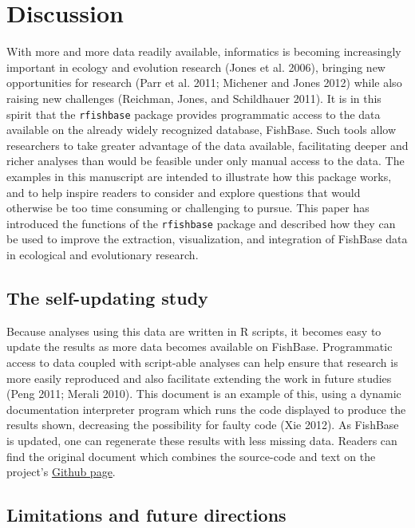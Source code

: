 \section{Discussion}

With more and more data readily available, informatics is becoming
increasingly important in ecology and evolution research (Jones et al.
2006), bringing new opportunities for research (Parr et al. 2011;
Michener and Jones 2012) while also raising new challenges (Reichman,
Jones, and Schildhauer 2011). It is in this spirit that the
\texttt{rfishbase} package provides programmatic access to the data
available on the already widely recognized database, FishBase. Such
tools allow researchers to take greater advantage of the data available,
facilitating deeper and richer analyses than would be feasible under
only manual access to the data. The examples in this manuscript are
intended to illustrate how this package works, and to help inspire
readers to consider and explore questions that would otherwise be too
time consuming or challenging to pursue. This paper has introduced the
functions of the \texttt{rfishbase} package and described how they can
be used to improve the extraction, visualization, and integration of
FishBase data in ecological and evolutionary research.

\subsection{The self-updating study}

Because analyses using this data are written in R scripts, it becomes
easy to update the results as more data becomes available on FishBase.
Programmatic access to data coupled with script-able analyses can help
ensure that research is more easily reproduced and also facilitate
extending the work in future studies (Peng 2011; Merali 2010). This
document is an example of this, using a dynamic documentation
interpreter program which runs the code displayed to produce the results
shown, decreasing the possibility for faulty code (Xie 2012). As
FishBase is updated, one can regenerate these results with less missing
data. Readers can find the original document which combines the
source-code and text on the project's
\href{https://github.com/ropensci/rfishbase/tree/master/inst/doc/rfishbase}{Github
page}.

\subsection{Limitations and future directions}

